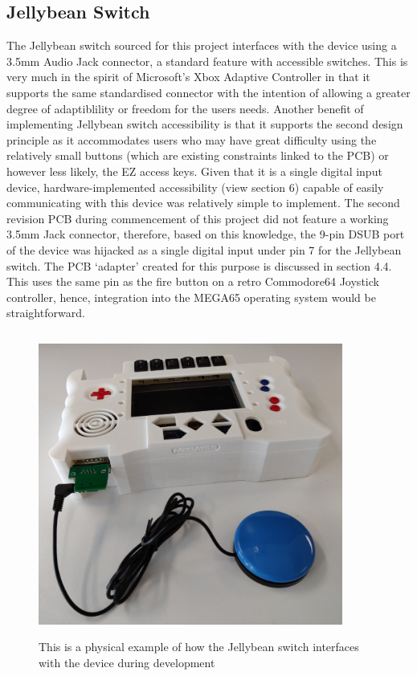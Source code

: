 \subsection{Jellybean Switch}

The Jellybean switch sourced for this project interfaces with the device using a 3.5mm Audio Jack connector, a standard feature with accessible switches.
This is very much in the spirit of Microsoft's Xbox Adaptive Controller\cite{adaptive} in that it supports the same standardised connector with the intention of allowing a greater degree of adaptiblility or freedom for the users needs.
Another benefit of implementing Jellybean switch accessibility is that it supports the second design principle as it accommodates users who may have great difficulty using the relatively small buttons (which are existing constraints linked to the PCB) or however less likely, the EZ access keys.
Given that it is a single digital input device, hardware-implemented accessibility (view section 6) capable of easily communicating with this device was relatively simple to implement. 
The second revision PCB during commencement of this project did not feature a working 3.5mm Jack connector, therefore, based on this knowledge, the 9-pin DSUB port of the device was hijacked as a single digital input under pin 7 for the Jellybean switch. 
The PCB ‘adapter’ created for this purpose is discussed in section 4.4.
This uses the same pin as the fire button on a retro Commodore64 Joystick controller, hence, integration into the MEGA65 operating system would be straightforward.

\begin{figure}[hbt!]
\centering
\includegraphics[width=10cm,height=10cm,keepaspectratio]{Figures/jellybean.jpg}
\caption{This is a physical example of how the Jellybean switch interfaces with the device during development}
\label{fig:Jellybean}
\end{figure}

